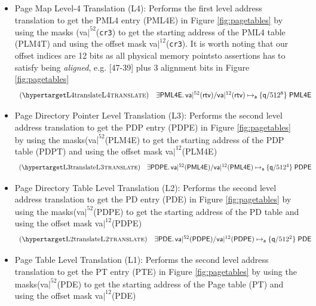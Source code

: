 \begin{itemize}
  \item Page Map Level-4 Translation (L4): Performs the first level address translation to get the PML4 entry (PML4E) in Figure \ref{fig:pagetables} by using the masks (\textsf{va}$|^{52}$(\lstinline{cr3}) to get the starting address of the PML4 table (PLM4T) and using the offset mask \textsf{va}$|^{12}$(\lstinline{cr3}). It is worth noting that our offset indices are 12 bits as all physical memory pointsto assertions has to satisfy being \textsf{\textit{aligned}}, e.g. [47-39] plus 3 alignment bits in Figure \ref{fig:pagetables}
    \[ \begin{array}{l}
      \hbox{(\TirNameStyle{{L4translate}})} \quad
      \exists \entryf \ldotp \nfpointsto{\mask\vaddr\ft\rtv}{\mask\vaddr\tw\rtv}\entryf\qfracfotsss\naddr
      \end{array}
      \]
  \item Page Directory Pointer Level Translation (L3): Performs the second level address translation to get the PDP entry (PDPE) in Figure \ref{fig:pagetables} by using the masks(\textsf{va}$|^{52}$(\textsf{PLM4E}) to get the starting address of the PDP table (PDPT) and using the offset mask \textsf{va}$|^{12}$(\textsf{PLM4E})
    \[\begin{array}{l}
    \hbox{(\TirNameStyle{{L3translate}})} \quad
    \exists \entrytr \ldotp \nfpointsto{\mask\vaddr\ft\entryf}{\mask\vaddr\tw\entryf}\entrytr\qfracfotss\naddr
    \end{array}
    \]
  \item Page Directory Table Level Translation (L2): Performs the second level address translation to get the PD entry (PDE) in Figure \ref{fig:pagetables} by using the masks(\textsf{va}$|^{52}$(\textsf{PDPE}) to get the starting address of the PD table and using the offset mask \textsf{va}$|^{12}$(\textsf{PDPE})
    \[ \begin{array}{l}
            \hbox{(\TirNameStyle{{L2translate}})} \quad 
       \exists \entrytw \ldotp \nfpointsto{\mask\vaddr\ft\entrytr}{\mask\vaddr\tw\entrytr}\entrytw\qfracfots\naddr
      \end{array}
      \]
  \item Page Table Level Translation (L1): Performs the second level address translation to get the PT entry (PTE) in Figure \ref{fig:pagetables} by using the masks(\textsf{va}$|^{52}$(\textsf{PDE}) to get the starting address of the Page table (PT) and using the offset mask \textsf{va}$|^{12}$(\textsf{PDE})
    \[ \begin{array}{l}

\end{array}\]
\end{itemize}
